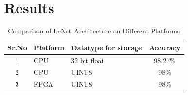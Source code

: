 \newpage

\section{Results}
\begin{table}[h]
    \centering
    \begin{tabularx}{1.1\textwidth}{|c|X|X|c|}
        \hline
        \textbf{Sr.No} & \textbf{Platform}  & \textbf{Datatype for storage} & \textbf{Accuracy} \\
        \hline
        1 &  CPU & 32 bit float    & 98.27\% \\
        \hline
        2 &  CPU & UINT8    & 98\% \\
        \hline
        3 &  FPGA & UINT8    & 98\% \\
        \hline


    \end{tabularx}
    \caption{Comparison of LeNet Architecture on Different Platforms}
    \label{tab:lenet_comparison}
\end{table}


























































